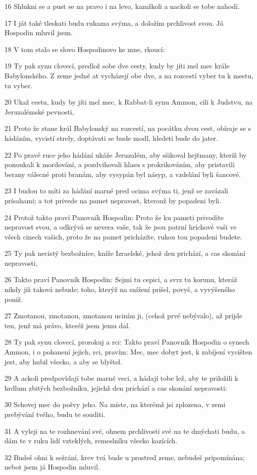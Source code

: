\par 16 Shlukni se a pust se na pravo i na levo, kamžkoli a nackoli se tobe nahodí.
\par 17 I ját také tleskati budu rukama svýma, a doložím prchlivost svou. Já Hospodin mluvil jsem.
\par 18 V tom stalo se slovo Hospodinovo ke mne, rkoucí:
\par 19 Ty pak synu clovecí, predlož sobe dve cesty, kudy by jíti mel mec krále Babylonského. Z zeme jedné at vycházejí obe dve, a na rozcestí vyber tu k mestu, tu vyber.
\par 20 Ukaž cestu, kudy by jíti mel mec, k Rabbat-li synu Ammon, cili k Judstvu, na Jeruzalémské pevnosti,
\par 21 Proto že stane král Babylonský na rozcestí, na pocátku dvou cest, obíraje se s hádáním, vycistí strely, doptávati se bude modl, hledeti bude do jater.
\par 22 Po pravé ruce jeho hádání ukáže Jeruzalém, aby sšikoval hejtmany, kteríž by ponoukali k mordování, a pozdvihovali hlasu s prokrikováním, aby pristavili berany válecné proti branám, aby vysypán byl násyp, a vzdelání byli šancové.
\par 23 I budou to míti za hádání marné pred ocima svýma ti, jenž se zavázali prísahami; a tot privede na pamet nepravost, kterouž by popadeni byli.
\par 24 Protož takto praví Panovník Hospodin: Proto že ku pameti privodíte nepravost svou, a odkrývá se nevera vaše, tak že jsou patrní hríchové vaši ve všech cinech vašich, proto že na pamet pricházíte, rukou tou popadeni budete.
\par 25 Ty pak necistý bezbožníce, kníže Izraelské, jehož den prichází, a cas skonání nepravosti,
\par 26 Takto praví Panovník Hospodin: Sejmi tu cepici, a svrz tu korunu, kteráž nikdy již taková nebude; toho, kterýž na snížení prišel, povyš, a vyvýšeného poniž.
\par 27 Zmotanou, zmotanou, zmotanou uciním ji, (cehož prvé nebývalo), až prijde ten, jenž má právo, kteréž jsem jemu dal.
\par 28 Ty pak synu clovecí, prorokuj a rci: Takto praví Panovník Hospodin o synech Ammon, i o pohanení jejich, rci, pravím: Mec, mec dobyt jest, k zabíjení vycišten jest, aby hubil všecko, a aby se blyštel.
\par 29 A ackoli predpovídají tobe marné veci, a hádají tobe lež, aby te priložili k hrdlum zbitých bezbožníku, jejichž den prichází a cas skonání nepravosti:
\par 30 Schovej mec do pošvy jeho. Na míste, na kterémž jsi zplozena, v zemi prebývání tvého, budu te souditi.
\par 31 A vyleji na te rozhnevání své, ohnem prchlivosti své na te dmýchati budu, a dám te v ruku lidí vzteklých, remeslníku všecko kazících.
\par 32 Budeš ohni k sežrání, krev tvá bude u prostred zeme, nebudeš pripomínána; nebot jsem já Hospodin mluvil.

